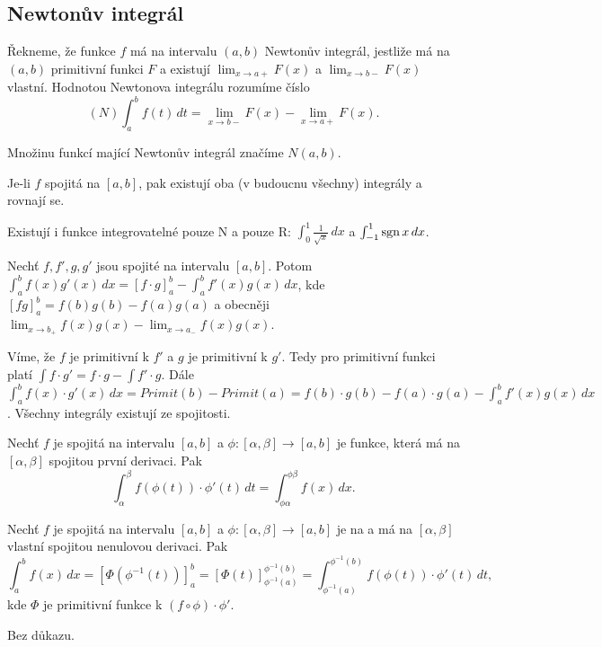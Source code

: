 \documentclass[12pt]{article}                   %
\begin{document}
    \subsection{Newtonův integrál}
        \begin{definice}
            Řekneme, že funkce $f$ má na intervalu $(a, b)$ Newtonův integrál, jestliže má na $(a, b)$ primitivní funkci $F$ a existují $\lim_{x \rightarrow a+} F(x)$ a $\lim_{x \rightarrow b-} F(x)$ vlastní. Hodnotou Newtonova integrálu rozumíme číslo
            $$ (N) \int_a^b f(t)\,dt = \lim_{x \rightarrow b-} F(x) - \lim_{x \rightarrow a+} F(x). $$ 

            Množinu funkcí mající Newtonův integrál značíme $N(a, b)$.
        \end{definice}

        \begin{dusledek}
            Je-li $f$ spojitá na $[a, b]$, pak existují oba (v budoucnu všechny) integrály a rovnají se.

            Existují i funkce integrovatelné pouze N a pouze R: $\int_0^1 \frac{1}{\sqrt{x}}\,dx$ a $\int_{-1}^1 \operatorname{sgn} x\,dx$.
        \end{dusledek}

        \begin{veta}
            Nechť $f, f', g, g'$ jsou spojité na intervalu $[a, b]$. Potom $\int_a^b f(x) g'(x)\,dx = [f·g]_a^b - \int_a^b f'(x) g(x)\,dx$, kde $[fg]_a^b = f(b)g(b) - f(a)g(a)$ a obecněji $\lim_{x \rightarrow b_+} f(x)g(x) - \lim_{x \rightarrow a_-} f(x)g(x)$.

            \begin{dukazin}
                Víme, že $f$ je primitivní k $f'$ a $g$ je primitivní k $g'$. Tedy pro primitivní funkci platí $\int f·g' = f·g - \int f'·g$. Dále $\int_a^b f(x)·g'(x)\,dx = Primit(b) - Primit(a) = f(b)·g(b) - f(a)·g(a) - \int_a^b f'(x)g(x)\,dx$. Všechny integrály existují ze spojitosti.
            \end{dukazin}
        \end{veta}

        \begin{veta}
            Nechť $f$ je spojitá na intervalu $[a, b]$ a $\phi:[\alpha, \beta] \rightarrow [a, b]$ je funkce, která má na $[\alpha, \beta]$ spojitou první derivaci. Pak
            $$ \int_\alpha^\beta f(\phi(t))·\phi'(t)\,dt = \int_{\phi\alpha}^{\phi\beta}f(x)\,dx. $$

            Nechť $f$ je spojitá na intervalu $[a, b]$ a $\phi: [\alpha, \beta] \rightarrow [a, b]$ je na a má na $[\alpha, \beta]$ vlastní spojitou nenulovou derivaci. Pak
            $$ \int_a^b f(x)\,dx = [\Phi(\phi^{-1}(t))]_a^b = [\Phi(t)]_{\phi^{-1}(a)}^{\phi^{-1}(b)} = \int_{\phi^{-1}(a)}^{\phi^{-1}(b)} f(\phi(t))·\phi'(t)\,dt, $$
            kde $\Phi$ je primitivní funkce k $(f \circ \phi)·\phi'$.
            \begin{dukazin}
                Bez důkazu.
            \end{dukazin}
        \end{veta}
\end{document}
